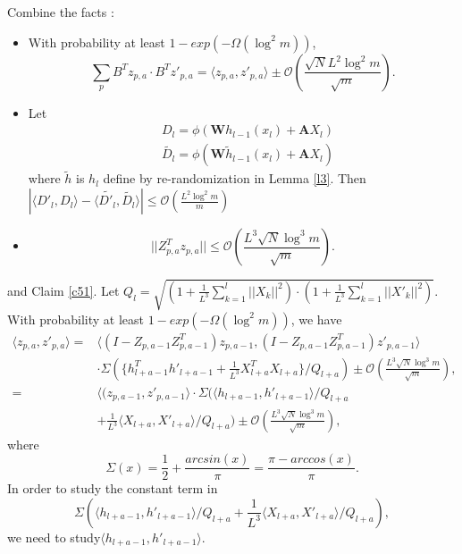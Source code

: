 \documentclass{article}
\newcommand{\cO}{\mathcal{O}}
\begin{document}
Combine the facts :
\begin{itemize}
\item With probability at least $1-exp(-\Omega(\log^2m))$,
\begin{equation}
\sum_pB^Tz_{p,a}\cdot B^Tz'_{p,a}=\langle z_{p,a}, z'_{p,a}\rangle \pm \cO(\frac{\sqrt{N}L^2\log^2m}{\sqrt{m}}).
\end{equation}
\item Let
\begin{equation}
\begin{aligned}
&D_l=\phi(\bm{W}h_{l-1}(x_l)+\bm{A}X_l)\\
&\widetilde{D_l}=\phi(\bm{W}\widetilde{h}_{l-1}(x_l)+\bm{A}X_l)
\end{aligned}
\end{equation}
where $\widetilde{h}$ is $h_l$ define by re-randomization in Lemma \ref{l3}. Then
$|\langle D'_l, D_l\rangle- \langle \widetilde{D'_l}, \widetilde{D_l}\rangle| \leq \cO(\frac{L^2\log^2m}{m})$

\item
\begin{equation}
||Z_{p,a}^Tz_{p,a}||\leq \cO(\frac{L^3\sqrt{N}\log^3m}{\sqrt{m}}).
\end{equation}
\end{itemize}
and Claim \ref{c51}. Let $Q_l=\sqrt{(1+\frac{1}{L^3}\sum_{k=1}^l||X_{k}||^2)\cdot(1+\frac{1}{L^3}\sum_{k=1}^l||X'_{k}||^2) }$.
With probability at least $1-exp(-\Omega(\log^2m))$, we have
\begin{equation}
\begin{aligned}
\langle z_{p,a}, z'_{p,a}\rangle=&\langle (I-Z_{p,a-1}Z_{p,a-1}^T)z_{p,a-1}, (I-Z_{p,a-1}Z_{p,a-1}^T)z'_{p,a-1}\rangle\\
 &\cdot \Sigma(\{h_{l+a-1}^Th'_{l+a-1}+ \frac{1}{L^3}X^T_{l+a}X_{l+a}\}/Q_{l+a}) \pm \cO(\frac{L^3\sqrt{N}\log^3m}{\sqrt{m}}),\\
 =&\langle (z_{p,a-1}, z'_{p,a-1}\rangle\cdot \Sigma(\langle h_{l+a-1}, h'_{l+a-1} \rangle/Q_{l+a}\\
 &+  \frac{1}{L^3}\langle X_{l+a},X'_{l+a} \rangle/Q_{l+a})
  \pm \cO(\frac{L^3\sqrt{N}\log^3m}{\sqrt{m}}),
\end{aligned}
\end{equation}
where
\begin{equation}
\Sigma(x)=\frac{1}{2}+\frac{ arcsin(x)}{\pi}=\frac{\pi-arccos(x)}{\pi}.
\end{equation}
In order to study the constant term in $$\Sigma(\langle h_{l+a-1}, h'_{l+a-1} \rangle/Q_{l+a}+ \frac{1}{L^3}\langle X_{l+a},X'_{l+a} \rangle/Q_{l+a}),$$ we need to study$ \langle h_{l+a-1}, h'_{l+a-1} \rangle.$
\end{document}
